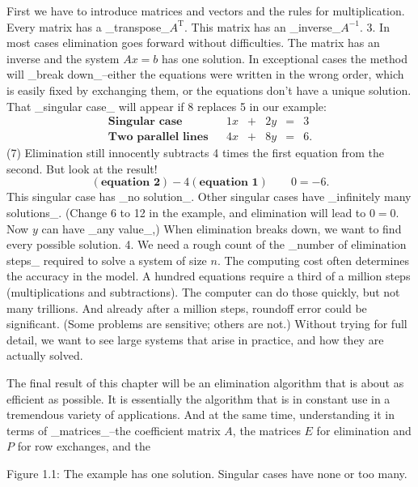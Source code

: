 First we have to introduce matrices and vectors and the rules for multiplication. Every matrix has a _transpose_\(A^{\mathrm{T}}\). This matrix has an _inverse_\(A^{-1}\).
3. In most cases elimination goes forward without difficulties. The matrix has an inverse and the system \(Ax=b\) has one solution. In exceptional cases the method will _break down_--either the equations were written in the wrong order, which is easily fixed by exchanging them, or the equations don't have a unique solution. That _singular case_ will appear if 8 replaces 5 in our example: \[\begin{array}{ccccccc}\textbf{Singular case}&&1x&+&2y&=&3\\ \textbf{Two parallel lines}&&4x&+&8y&=&6.\end{array}\] (7) Elimination still innocently subtracts 4 times the first equation from the second. But look at the result! \[(\textbf{equation 2})-4(\textbf{equation 1})\qquad 0=-6.\] This singular case has _no solution_. Other singular cases have _infinitely many solutions_. (Change 6 to 12 in the example, and elimination will lead to \(0=0\). Now \(y\) can have _any value_,) When elimination breaks down, we want to find every possible solution.
4. We need a rough count of the _number of elimination steps_ required to solve a system of size \(n\). The computing cost often determines the accuracy in the model. A hundred equations require a third of a million steps (multiplications and subtractions). The computer can do those quickly, but not many trillions. And already after a million steps, roundoff error could be significant. (Some problems are sensitive; others are not.) Without trying for full detail, we want to see large systems that arise in practice, and how they are actually solved.

The final result of this chapter will be an elimination algorithm that is about as efficient as possible. It is essentially the algorithm that is in constant use in a tremendous variety of applications. And at the same time, understanding it in terms of _matrices_--the coefficient matrix \(A\), the matrices \(E\) for elimination and \(P\) for row exchanges, and the

Figure 1.1: The example has one solution. Singular cases have none or too many.

 